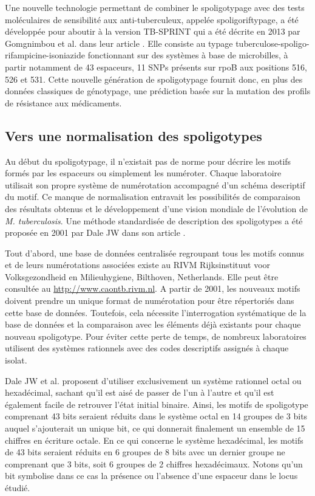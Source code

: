 \documentclass[twoside,a4paper,11pt,frenchb,openany]{report}
\begin{document}
Une nouvelle technologie permettant de combiner le spoligotypage avec des tests moléculaires de sensibilité aux anti-tuberculeux, appelée spoligoriftypage, a été développée pour aboutir à la version TB-SPRINT qui a été décrite en 2013 par Gomgnimbou et al. dans leur article \cite{gomgnimbou}. Elle consiste au typage tuberculose-spoligo-rifampicine-isoniazide fonctionnant sur des systèmes à base de microbilles, à partir notamment de 43 espaceurs, 11 SNPs présents sur rpoB aux positions 516, 526 et 531. Cette nouvelle génération de spoligotypage fournit donc, en plus des données classiques de génotypage, une prédiction basée sur la mutation des profils de résistance aux médicaments.


\subsection{Vers une normalisation des spoligotypes}

Au début du spoligotypage, il n'existait pas de norme pour décrire les motifs formés par les espaceurs ou simplement les numéroter. Chaque laboratoire utilisait son propre système de numérotation accompagné d'un schéma descriptif du motif. Ce manque de normalisation entravait les possibilités de comparaison des résultats obtenus et le développement d'une vision mondiale de l'évolution de \textit{M. tuberculosis}. Une méthode standardisée de description des spoligotypes a été proposée en 2001 par Dale JW dans son article \cite{dale}. 

Tout d'abord, une base de données centralisée regroupant tous les motifs connus et de leurs numérotations associées existe au RIVM Rijksinstituut voor Volksgezondheid en Milieuhygiene, Bilthoven, Netherlands. Elle peut être consultée au \url{http://www.caontb.rivm.nl}. A partir de 2001, les nouveaux motifs doivent prendre un unique format de numérotation pour être répertoriés dans cette base de données. Toutefois, cela nécessite l'interrogation systématique de la base de données et la comparaison avec les éléments déjà existants pour chaque nouveau spoligotype. Pour éviter cette perte de temps, de nombreux laboratoires utilisent des systèmes rationnels avec des codes descriptifs assignés à chaque isolat. 

Dale JW et al.\cite{dale} proposent d'utiliser exclusivement un système rationnel octal ou hexadécimal, sachant qu'il est aisé de passer de l'un à l'autre et qu'il est également facile de retrouver l'état initial binaire. Ainsi, les motifs de spoligotype comprenant 43 bits seraient réduits dans le système octal en 14 groupes de 3 bits auquel s'ajouterait un unique bit, ce qui donnerait finalement un ensemble de 15 chiffres en écriture octale. En ce qui concerne le système hexadécimal, les motifs de 43 bits seraient réduits en 6 groupes de 8 bits avec un dernier groupe ne comprenant que 3 bits, soit 6 groupes de 2 chiffres hexadécimaux. Notons qu'un bit symbolise dans ce cas la présence ou l'absence d'une espaceur dans le locus étudié.
\end{document}
